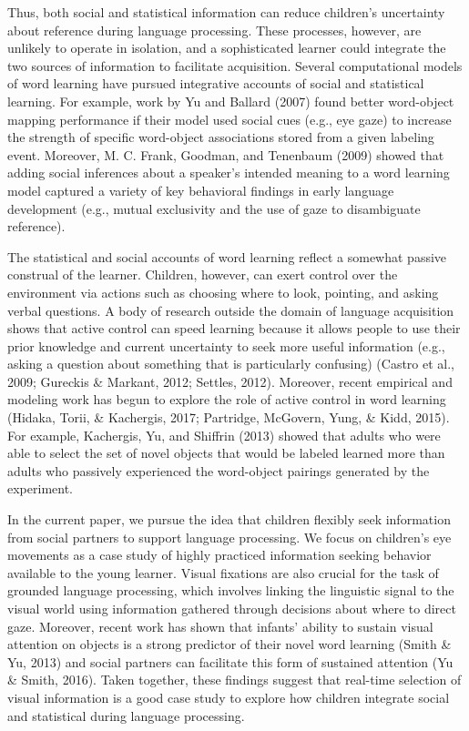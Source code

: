 \documentclass[man,floatsintext]{apa6}
\begin{document}
Thus, both social and statistical information can reduce children's
uncertainty about reference during language processing. These processes,
however, are unlikely to operate in isolation, and a sophisticated
learner could integrate the two sources of information to facilitate
acquisition. Several computational models of word learning have pursued
integrative accounts of social and statistical learning. For example,
work by Yu and Ballard (2007) found better word-object mapping
performance if their model used social cues (e.g., eye gaze) to increase
the strength of specific word-object associations stored from a given
labeling event. Moreover, M. C. Frank, Goodman, and Tenenbaum (2009)
showed that adding social inferences about a speaker's intended meaning
to a word learning model captured a variety of key behavioral findings
in early language development (e.g., mutual exclusivity and the use of
gaze to disambiguate reference).

The statistical and social accounts of word learning reflect a somewhat
passive construal of the learner. Children, however, can exert control
over the environment via actions such as choosing where to look,
pointing, and asking verbal questions. A body of research outside the
domain of language acquisition shows that active control can speed
learning because it allows people to use their prior knowledge and
current uncertainty to seek more useful information (e.g., asking a
question about something that is particularly confusing) (Castro et al.,
2009; Gureckis \& Markant, 2012; Settles, 2012). Moreover, recent
empirical and modeling work has begun to explore the role of active
control in word learning (Hidaka, Torii, \& Kachergis, 2017; Partridge,
McGovern, Yung, \& Kidd, 2015). For example, Kachergis, Yu, and Shiffrin
(2013) showed that adults who were able to select the set of novel
objects that would be labeled learned more than adults who passively
experienced the word-object pairings generated by the experiment.

In the current paper, we pursue the idea that children flexibly seek
information from social partners to support language processing. We
focus on children's eye movements as a case study of highly practiced
information seeking behavior available to the young learner. Visual
fixations are also crucial for the task of grounded language processing,
which involves linking the linguistic signal to the visual world using
information gathered through decisions about where to direct gaze.
Moreover, recent work has shown that infants' ability to sustain visual
attention on objects is a strong predictor of their novel word learning
(Smith \& Yu, 2013) and social partners can facilitate this form of
sustained attention (Yu \& Smith, 2016). Taken together, these findings
suggest that real-time selection of visual information is a good case
study to explore how children integrate social and statistical during
language processing.
\end{document}
